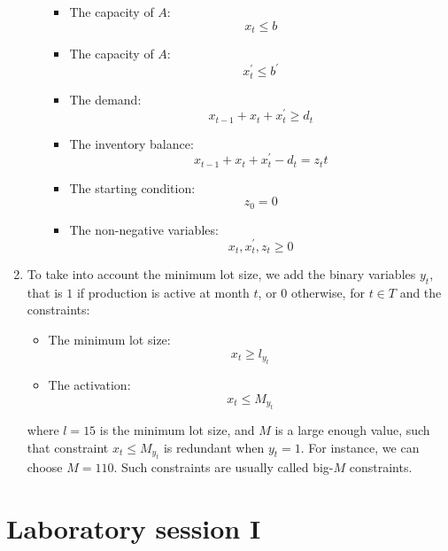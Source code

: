 \documentclass[12pt, a4paper]{report}
\newtheorem[style=M,bodystyle=\normalfont]{theorem}{Theorem}
\newtheorem[style=M,bodystyle=\normalfont]{corollary}{Corollary}
\newtheorem[style=M,bodystyle=\normalfont]{lemma}{Lemma}
\newtheorem[style=M,bodystyle=\normalfont]{definition}{Definition}
\begin{document}
\begin{enumerate}
\begin{itemize}
                        \begin{itemize}
                            \item The capacity of $A$: 
                                \[x_t \leq b\]
                            \item The capacity of $A$: 
                                \[x_t^{'} \leq b^{'}\]
                            \item The demand: 
                                \[x_{t-1}+x_t+x_t^{'} \geq d_t\]
                            \item The inventory balance: 
                                \[x_{t-1}+x_t+x_t^{'}-d_t = z_tt\]
                            \item The starting condition: 
                                \[z_0=0\]
                            \item The non-negative variables: 
                                \[x_t,x_t^{'},z_t \geq 0\]
                            \end{itemize}
                \end{itemize}
            \item To take into account the minimum lot size, we add the binary variables $y_t$, that is $1$ if production is active at month $t$, or $0$ otherwise, for 
                $t \in T$ and the constraints: 
                \begin{itemize}
                    \item The minimum lot size: 
                        \[x_t \geq l_{y_t}\]
                    \item The activation: 
                        \[x_t \leq M_{y_t}\]
                \end{itemize}
                where $l = 15$ is the minimum lot size, and $M$ is a large enough value, such that constraint $x_t \leq M_{y_t}$ is redundant when $y_t=1$. For instance, 
                we can choose $M = 110$. Such constraints are usually called big-$M$ constraints. 
        \end{enumerate}

\newpage

\chapter{Laboratory session I}
\end{document}
